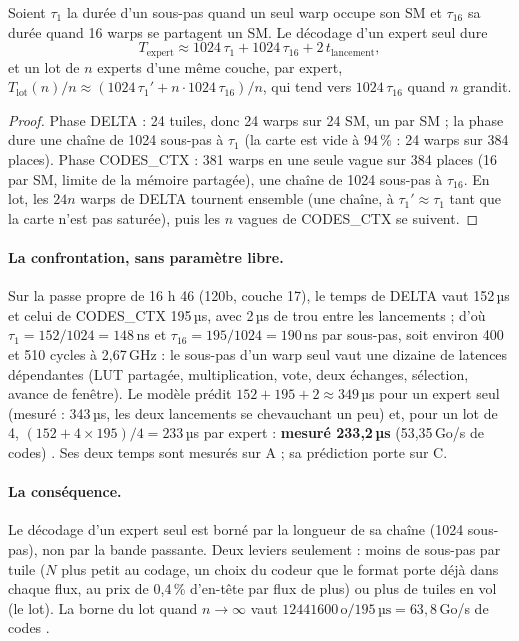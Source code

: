\begin{proposition}\label{prop:t2n-latence}
Soient $\tau_1$ la durée d'un sous-pas quand un seul warp occupe son SM et $\tau_{16}$ sa durée quand 16 warps se partagent un SM. Le décodage d'un expert seul dure
\[
T_{\mathrm{expert}} \approx \num{1024}\,\tau_1 + \num{1024}\,\tau_{16} + 2\,t_{\mathrm{lancement}},
\]
et un lot de $n$ experts d'une même couche, par expert, $T_{\mathrm{lot}}(n)/n \approx (\num{1024}\,\tau_1' + n \cdot \num{1024}\,\tau_{16})/n$, qui tend vers $\num{1024}\,\tau_{16}$ quand $n$ grandit.
\end{proposition}

\begin{proof}
Phase DELTA : 24 tuiles, donc 24 warps sur 24 SM, un par SM ; la phase dure une chaîne de \num{1024} sous-pas à $\tau_1$ (la carte est vide à 94\,\% : 24 warps sur 384 places). Phase CODES\_CTX : 381 warps en une seule vague sur 384 places (16 par SM, limite de la mémoire partagée), une chaîne de \num{1024} sous-pas à $\tau_{16}$. En lot, les $24n$ warps de DELTA tournent ensemble (une chaîne, à $\tau_1' \approx \tau_1$ tant que la carte n'est pas saturée), puis les $n$ vagues de CODES\_CTX se suivent.
\end{proof}

\paragraph{La confrontation, sans paramètre libre.} Sur la passe propre de 16 h 46 (120b, couche 17), le temps de DELTA vaut 152\,µs et celui de CODES\_CTX 195\,µs, avec 2\,µs de trou entre les lancements \mes ; d'où $\tau_1 = 152/\num{1024} = 148$\,ns et $\tau_{16} = 195/\num{1024} = 190$\,ns par sous-pas, soit environ 400 et 510 cycles à 2,67\,GHz \calc : le sous-pas d'un warp seul vaut une dizaine de latences dépendantes (LUT partagée, multiplication, vote, deux échanges, sélection, avance de fenêtre). Le modèle prédit $152 + 195 + 2 \approx 349$\,µs pour un expert seul (mesuré : 343\,µs, les deux lancements se chevauchant un peu) et, pour un lot de 4, $(152 + 4 \times 195)/4 = 233$\,µs par expert : \textbf{mesuré 233,2\,µs} (53,35\,Go/s de codes) \calc. Ses deux temps sont mesurés sur A ; sa prédiction porte sur C.

\paragraph{La conséquence.} Le décodage d'un expert seul est borné par la longueur de sa chaîne (\num{1024} sous-pas), non par la bande passante. Deux leviers seulement : moins de sous-pas par tuile ($N$ plus petit au codage, un choix du codeur que le format porte déjà dans chaque flux, au prix de 0,4\,\% d'en-tête par flux de plus) ou plus de tuiles en vol (le lot). La borne du lot quand $n \to \infty$ vaut $\num{12441600}\,\text{o} / 195\,\text{µs} = 63{,}8$\,Go/s de codes \calc.

